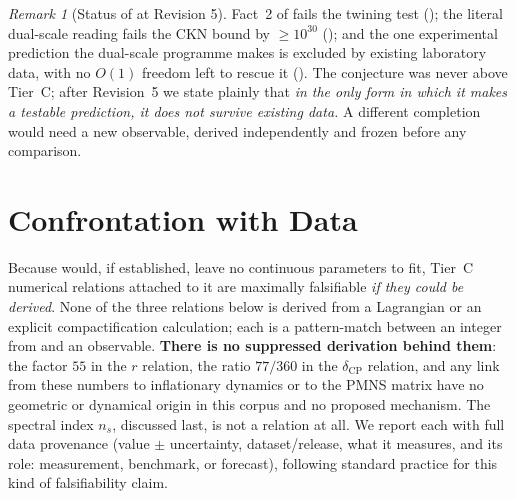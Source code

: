 \documentclass[11pt,a4paper]{article}
\theoremstyle{remark}
\newtheorem{remark}[theorem]{Remark}
\begin{document}
\begin{remark}[Status of  at Revision 5] \label{rem:conj-status}
Fact~2 of  fails the twining test (); the literal dual-scale
reading fails the CKN bound by $\ge10^{30}$ (); and the one experimental prediction
the dual-scale programme makes is excluded by existing laboratory data, with no $O(1)$ freedom left to
rescue it (). The conjecture was never above Tier~C; after Revision~5 we state
plainly that \emph{in the only form in which it makes a testable prediction, it does not survive existing
data.} A different completion would need a new observable, derived independently and frozen before any
comparison.
\end{remark}

\section{Confrontation with Data}
\label{sec:phenomenology}

Because  would, if established, leave no continuous parameters to fit,
Tier~C numerical relations attached to it are maximally falsifiable \emph{if they could be derived}.
None of the three relations below is derived from a Lagrangian or an explicit compactification
calculation; each is a pattern-match between an integer from  and an observable.
\textbf{There is no suppressed derivation behind them}: the factor $55$ in the $r$ relation, the ratio
$77/360$ in the $\delta_{\mathrm{CP}}$ relation, and any link from these numbers to inflationary
dynamics or to the PMNS matrix have no geometric or dynamical origin in this corpus and no proposed
mechanism. The spectral index $n_s$, discussed last, is not a relation at all. We
report each with full data provenance (value $\pm$ uncertainty, dataset/release, what it measures,
and its role: measurement, benchmark, or forecast), following standard practice for this kind of
falsifiability claim.
\end{document}
